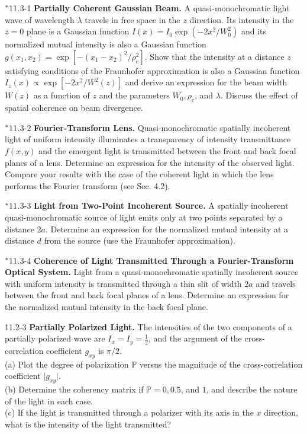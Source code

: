 \documentclass{article}
\numberwithin{figure}{subsection}
\numberwithin{table}{subsection}
\begin{document}
{\begin{hangparas}{1.4cm}{1}
\par$\prescript{\ast}{}{11}$.3-1 \quad\textbf{Partially Coherent Gaussian Beam.} A quasi-monochromatic light wave of wavelength $\lambda$ travels in free space in the $z$ direction. Its intensity in the $z = 0$ plane is a Gaussian function $I(x) = I_0 \exp(- 2x^2 / W_0^2)$ and its normalized mutual intensity is also a Gaussian function $g(x_1, x_2) = \exp [-(x_1 - x_2)^2 / \rho_c^2]$. Show that the intensity at a distance $z$ satisfying conditions of the Fraunhofer approximation is also a Gaussian function $I_z (x) \propto \exp [- 2x^2 / W^2 (z)]$ and derive an expression for the beam width $W(z)$ as a function of $z$ and the parameters $W_0, \rho_c$, and $\lambda$. Discuss the effect of spatial coherence on beam divergence.
\par$\prescript{\ast}{}{11}$.3-2 \quad\textbf{Fourier-Transform Lens.} Quasi-monochromatic spatially incoherent light of uniform intensity illuminates a transparency of intensity transmittance $f(x, y)$ and the emergent light is transmitted between the front and back focal planes of a lens. Determine an expression for the intensity of the observed light. Compare your results with the case of the coherent light in which the lens performs the Fourier transform (see Sec. 4.2).
\par$\prescript{\ast}{}{11}$.3-3 \quad\textbf{Light from Two-Point Incoherent Source.} A spatially incoherent quasi-monochromatic source of light emits only at two points separated by a distance $2a$. Determine an expression for the normalized mutual intensity at a distance $d$ from the source (use the Fraunhofer approximation).
\par$\prescript{\ast}{}{11}$.3-4 \quad\textbf{Coherence of Light Transmitted Through a Fourier-Transform Optical System.} Light from a quasi-monochromatic spatially incoherent source with uniform intensity is transmitted through a thin slit of width $2a$ and travels between the front and back focal planes of a lens. Determine an expression for the normalized mutual intensity in the back focal plane.
\par 11.2-3 \quad\textbf{Partially Polarized Light.} The intensities of the two components of a partially polarized wave are $I_x = I_y = \frac{1}{2}$, and the argument of the cross-correlation coefficient $g_{xy}$ is $\pi / 2$.\\
(a) Plot the degree of polarization $\mathbb{P}$ versus the magnitude of the cross-correlation coefficient $\lvert g_{xy} \rvert$.\\
(b) Determine the coherency matrix if $\mathbb{P} = 0, 0.5$, and $1$, and describe the nature of the light in each case.\\
(c) If the light is transmitted through a polarizer with its axis in the $x$ direction, what is the intensity of the light transmitted?
\end{hangparas}
}
\end{document}
